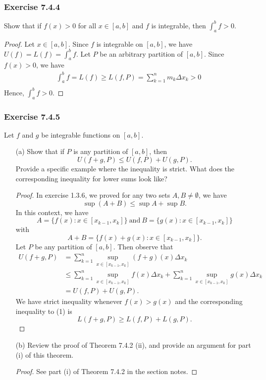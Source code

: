 \subsubsection{Exercise 7.4.4} Show that if \( f(x) > 0  \) for all \( x \in [a,b]  \) and \( f  \) is integrable, then \( \int_{ a }^{ b } f > 0 . \)
\begin{proof}
	Let \( x \in [a,b]  \). Since \( f \) is integrable on \( [a,b]  \), we have \( U(f) = L(f) = \int_{ a }^{ b } f   \). Let \( P \) be an arbitrary partition of \( [a,b]  \). Since \( f(x) > 0  \), we have
	\begin{align*}
		\int_{ a }^{ b } f = L(f) \geq L(f, P)  
								  = \sum_{ k=1 }^{ n } m_{k } \Delta x_{k }  > 0 \\
	\end{align*}
	Hence, \( \int_{ a }^{ b } f > 0  \).
\end{proof}

\subsubsection{Exercise 7.4.5} Let \( f  \) and \( g  \) be integrable functions on \( [a,b] \). 
\begin{enumerate}
	\item[(a)] Show that if \( P  \) is any partition of \( [a,b]  \), then 
		\[  U(f+g, P ) \leq U(f,P) + U(g,P) \tag{1}. \]
		Provide a specific example where the inequality is strict. What does the corresponding inequality for lower sums look like? 

		\begin{proof}
		In exercise 1.3.6, we proved for any two sets \( A,B \neq \emptyset  \), we have 
		\[  \sup(A + B) \leq \sup A + \sup B. \]
		In this context, we have 
		\[ A =  \{ f(x) : x \in [x_{k-1}, x_{k}] \} \ \text{and} \ B =  \{ g(x) : x \in [x_{k-1}, x_{k }] \} \]
		with 
		\[  A + B = \{ f(x) + g(x) : x \in [x_{k-1} , x_{k }] \} . \]
		Let \( P  \) be any partition of \( [a,b]  \). Then observe that 
		\begin{align*}
			U(f+g, P) &=\sum_{ k=1 }^{ n } \sup_{x \in [x_{k-1}, x_{k }]}(f+g)(x) \Delta x_{k } \\
					  &\leq \sum_{ k=1 }^{ n } \sup_{x \in [x_{k-1}, x_{k }]}f(x) \Delta x_{k}  + \sum_{ k=1 }^{ n } \sup_{x \in [x_{k-1}, x_{k}]} g(x) \Delta x_{k } \\  
					  &= U(f,P) + U(g,P).
		\end{align*}
		We have strict inequality whenever \( f(x) > g(x)  \) and the corresponding inequality to (1) is 
		\[  L(f+g,P) \geq L(f, P) + L(g, P). \]
		\end{proof}
	\item[(b)] Review the proof of Theorem 7.4.2 (ii), and provide an argument for part (i) of this theorem.
		\begin{proof}
			See part (i) of Theorem 7.4.2 in the section notes.
		\end{proof}
\end{enumerate}
